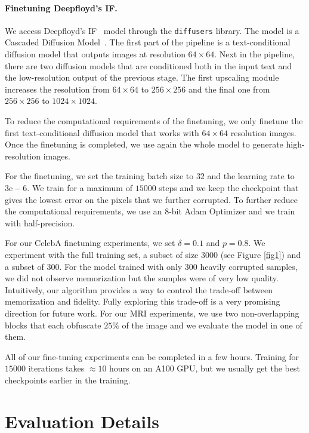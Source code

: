 \documentclass{article}
\begin{document}
\paragraph{Finetuning Deepfloyd's IF.} We access Deepfloyd's IF~\cite{if_repo} model through the \texttt{diffusers} library. The model is a Cascaded Diffusion Model~\citep{ho2022cascaded}. The first part of the pipeline is a text-conditional diffusion model that outputs images at resolution $64\times 64$. Next in the pipeline, there are two diffusion models that are conditioned both in the input text and the low-resolution output of the previous stage. The first upscaling module increases the resolution from $64\times64$ to $256\times 256$ and the final one from $256\times256$ to $1024\times1024$.

To reduce the computational requirements of the finetuning, we only finetune the first text-conditional diffusion model that works with $64\times 64$ resolution images. Once the finetuning is completed, we use again the whole model to generate high-resolution images. 

For the finetuning, we set the training batch size to $32$ and the learning rate to $3\mathrm{e}-6$. We train for a maximum of $15000$ steps and we keep the checkpoint that gives the lowest error on the pixels that we further corrupted. To further reduce the computational requirements, we use an 8-bit Adam Optimizer and we train with half-precision. 

For our CelebA finetuning experiments, we set $\delta=0.1$ and $p=0.8$. We experiment with the full training set, a subset of size $3000$ (see Figure \ref{fig1}) and a subset of $300$. For the model trained with only $300$ heavily corrupted samples, we did not observe memorization but the samples were of very low quality. Intuitively, our algorithm provides a way to control the trade-off between memorization and fidelity. Fully exploring this trade-off is a very promising direction for future work. For our MRI experiments, we use two non-overlapping blocks that each obfuscate $25\%$ of the image and we evaluate the model in one of them.

All of our fine-tuning experiments can be completed in a few hours. Training for $15000$ iterations takes $\approx 10$ hours on an A100 GPU, but we usually get the best checkpoints earlier in the training.







\section{Evaluation Details}
\end{document}
